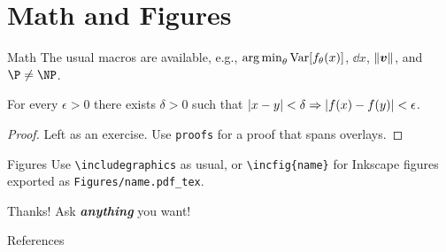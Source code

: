 \documentclass[aspectratio=169,10pt]{beamer}
\begin{document}
\section{Math and Figures}

\begin{frame}{Math}
    The usual macros are available, e.g., \(\operatorname*{arg\,min}_{\theta} \operatorname{Var}[f_\theta(x)]\), \(\dd{x}\), \(\norm{\bm{v}}\), and \(\P \neq \NP\).
    \pause
    \begin{theorem}[A statement]
        For every \(\epsilon > 0\) there exists \(\delta > 0\) such that \(\abs{x - y} < \delta \Rightarrow \abs{f(x) - f(y)} < \epsilon\).
    \end{theorem}
    \pause
    \begin{proof}
        Left as an exercise. Use \texttt{proofs} for a proof that spans overlays.
    \end{proof}
\end{frame}

\begin{frame}[fragile]{Figures}
    Use \texttt{\textbackslash includegraphics} as usual, or \texttt{\textbackslash incfig\{name\}} for Inkscape figures exported as \texttt{Figures/name.pdf\_tex}.
    \begin{center}
    \end{center}
\end{frame}

\begin{frame}[standout]
    Thanks! Ask \textbf{\emph{anything}} you want!
\end{frame}

\appendix

\begin{frame}[allowframebreaks]{References}
    \printbibliography[heading=none]
\end{frame}
\end{document}
